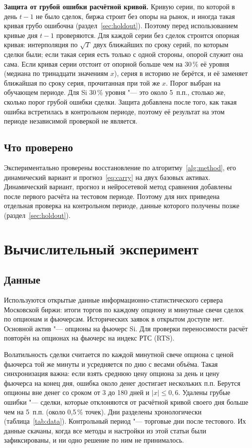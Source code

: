 \documentclass{article}
\begin{document}
\textbf{Защита от грубой ошибки расчётной кривой.} Кривую серии, по которой в день $t-1$ не было сделок, биржа строит без опоры на рынок, и иногда такая кривая грубо ошибочна (раздел~\ref{sec:holdout}). Поэтому перед использованием кривые дня $t-1$ проверяются. Для каждой серии без сделок строится опорная кривая: интерполяция по $\sqrt{T}$ двух ближайших по сроку серий, по которым сделки были; если такая серия есть только с одной стороны, опорой служит она сама. Если кривая серии отстоит от опорной больше чем на 30\,\% её уровня (медиана по тринадцати значениям $x$), серия в историю не берётся, и её заменяет ближайшая по сроку серия, прочитанная при той же $x$. Порог выбран на обучающем периоде. Для Si 30\,\% уровня "--- это около 5~п.п., столько же, сколько порог грубой ошибки сделки. Защита добавлена после того, как такая ошибка встретилась в контрольном периоде, поэтому её результат на этом периоде независимой проверкой не является.

\subsection{Что проверено}

Экспериментально проверены восстановление по алгоритму~\ref{alg:method}, его динамический вариант и прогноз~\eqref{eq:carry} на двух базовых активах. Динамический вариант, прогноз и нейросетевой метод сравнения добавлены после первого расчёта на тестовом периоде. Поэтому для них приведена отдельная проверка на контрольном периоде, данные которого получены позже (раздел~\ref{sec:holdout}).

\section{Вычислительный эксперимент}\label{sec:exp}

\subsection{Данные}

Используются открытые данные информационно-статистического сервера Московской биржи: итоги торгов по каждому опциону и минутные свечи сделок по опционам и фьючерсам. Исторических заявок в открытом доступе нет. Основной актив "--- опционы на фьючерс Si. Для проверки переносимости расчёт повторён на опционах на фьючерс на индекс РТС (RTS).

Волатильность сделки считается по каждой минутной свече опциона с ценой фьючерса той же минуты и усредняется по дню с весами объёма. Такая синхронизация важна: если взять среднюю цену опциона за день и цену фьючерса на конец дня, ошибка около денег достигает нескольких п.п. Берутся опционы вне денег со сроком от 3 до 180 дней и $|x|\le 0{,}6$. Удалены грубые ошибки "--- сделки, которые отклоняются от расчётной кривой своего дня больше чем на 5~п.п. (около 0{,}5\,\% точек). Дни разделены хронологически (таблица~\ref{tab:data}). Контрольный период "--- торговые дни после тестового. Их данные скачаны, когда все методы и настройки из этой статьи были зафиксированы, и ни одно решение по ним не принималось.
\end{document}
